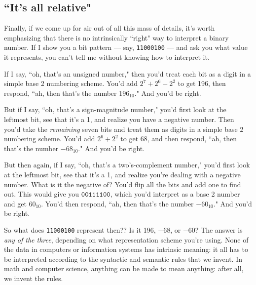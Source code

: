 \subsection{``It's all relative"}

Finally, if we come up for air out of all this mass of details, it's worth
emphasizing that there is no intrinsically ``right" way to interpret a
binary number. If I show you a bit pattern --- say, \texttt{11000100} ---
and ask you what value it represents, you can't tell me without knowing how
to interpret it.

If I say, ``oh, that's an unsigned number," then you'd treat each bit as a
digit in a simple base 2 numbering scheme. You'd add $2^7 + 2^6 + 2^2$ to
get 196, then respond, ``ah, then that's the number $196_{10}$." And you'd
be right.

But if I say, ``oh, that's a sign-magnitude number," you'd first look at
the leftmost bit, see that it's a 1, and realize you have a negative
number. Then you'd take the \textit{remaining} seven bits and treat them
as digits in a simple base 2 numbering scheme. You'd add $2^6 + 2^2$ to get
68, and then respond, ``ah, then that's the number $-68_{10}$." And you'd
be right.

But then again, if I say, ``oh, that's a two's-complement number," you'd
first look at the leftmost bit, see that it's a 1, and realize you're
dealing with a negative number. What is it the negative of? You'd flip all
the bits and add one to find out. This would give you $\texttt{00111100}$,
which you'd interpret as a base 2 number and get $60_{10}$. You'd then
respond, ``ah, then that's the number $-60_{10}$." And you'd be right.

So what does \texttt{11000100} represent then?? Is it 196, $-68$, or $-60$?
The answer is \textit{any of the three}, depending on what representation
scheme you're using. None of the data in computers or information systems
has intrinsic meaning: it all has to be interpreted according to the
syntactic and semantic rules that we invent. In math and computer science,
anything can be made to mean anything: after all, we invent the rules.
